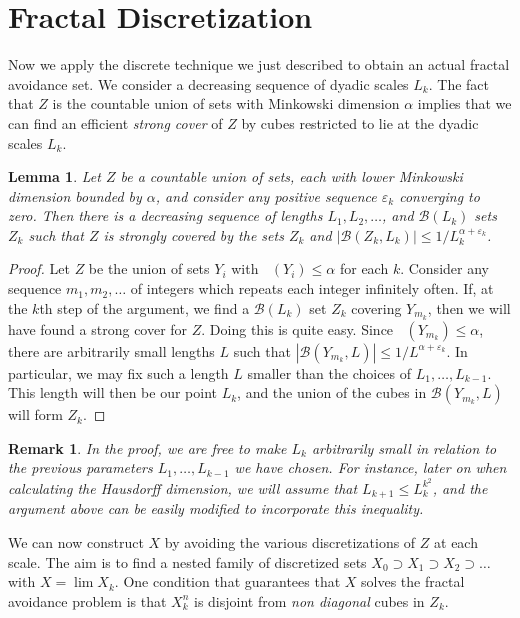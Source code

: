\documentclass{article}
\theoremstyle{plain}
\newtheorem{lemma}{Lemma}
\theoremstyle{plain}
\newtheorem*{remark}{Remark}
\DeclareMathOperator{\lhdim}{\underline{\dim}_{\mathbf{M}}}
\begin{document}
\section{Fractal Discretization}

Now we apply the discrete technique we just described to obtain an actual fractal avoidance set. We consider a decreasing sequence of dyadic scales $L_k$. The fact that $Z$ is the countable union of sets with Minkowski dimension $\alpha$ implies that we can find an efficient {\it strong cover} of $Z$ by cubes restricted to lie at the dyadic scales $L_k$.

\begin{lemma}
	Let $Z$ be a countable union of sets, each with lower Minkowski dimension bounded by $\alpha$, and consider any positive sequence $\varepsilon_k$ converging to zero. Then there is a decreasing sequence of lengths $L_1, L_2, \dots$, and $\mathcal{B}(L_k)$ sets $Z_k$ such that $Z$ is strongly covered by the sets $Z_k$ and $|\mathcal{B}(Z_k, L_k)| \leq 1/L_k^{\alpha + \varepsilon_k}$.
\end{lemma}
\begin{proof}
	Let $Z$ be the union of sets $Y_i$ with $\lhdim(Y_i) \leq \alpha$ for each $k$. Consider any sequence $m_1, m_2, \dots$ of integers which repeats each integer infinitely often. If, at the $k$th step of the argument, we find a $\mathcal{B}(L_k)$ set $Z_k$ covering $Y_{m_k}$, then we will have found a strong cover for $Z$. Doing this is quite easy. Since $\lhdim(Y_{m_k}) \leq \alpha$, there are arbitrarily small lengths $L$ such that $|\mathcal{B}(Y_{m_k},L)| \leq 1/L^{\alpha + \varepsilon_k}$. In particular, we may fix such a length $L$ smaller than the choices of $L_1, \dots, L_{k-1}$. This length will then be our point $L_k$, and the union of the cubes in $\mathcal{B}(Y_{m_k},L)$ will form $Z_k$.
\end{proof}

\begin{remark}
	In the proof, we are free to make $L_k$ arbitrarily small in relation to the previous parameters $L_1, \dots, L_{k-1}$ we have chosen. For instance, later on when calculating the Hausdorff dimension, we will assume that $L_{k+1} \leq L_k^{k^2}$, and the argument above can be easily modified to incorporate this inequality.
\end{remark}

We can now construct $X$ by avoiding the various discretizations of $Z$ at each scale. The aim is to find a nested family of discretized sets $X_0 \supset X_1 \supset X_2 \supset \dots$ with $X = \lim X_k$. One condition that guarantees that $X$ solves the fractal avoidance problem is that $X_k^n$ is disjoint from {\it non diagonal} cubes in $Z_k$.
\end{document}
